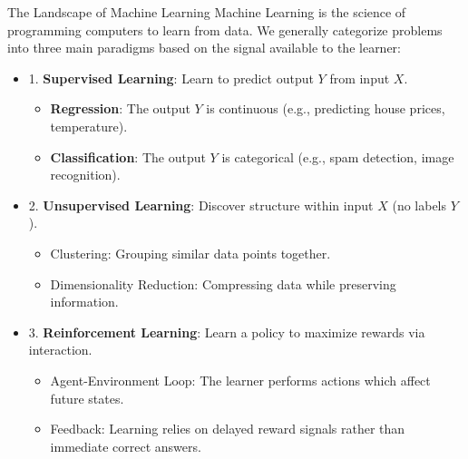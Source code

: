 \documentclass[aspectratio=169]{beamer}
\newcommand{\1}{\mathbf{1}}
\begin{document}
\begin{frame}{The Landscape of Machine Learning}
\small
    Machine Learning is the science of programming computers to learn from data.
    We generally categorize problems into three main paradigms based on the signal available to the learner:

    \vspace{0.5em}

    \begin{itemize}
        \setlength\itemsep{0.8em} %
        
        \item 1. \textbf{Supervised Learning}: Learn to predict output $Y$ from input $X$.
        \begin{itemize}
            \item \textbf{Regression}: The output $Y$ is continuous (e.g., predicting house prices, temperature).
            \item \textbf{Classification}: The output $Y$ is categorical (e.g., spam detection, image recognition).
        \end{itemize}

        \item 2. \textbf{Unsupervised Learning}: Discover structure within input $X$ (no labels $Y$).
        \begin{itemize}
            \item Clustering: Grouping similar data points together.
            \item Dimensionality Reduction: Compressing data while preserving information.
        \end{itemize}

        \item 3. \textbf{Reinforcement Learning}: Learn a policy to maximize rewards via interaction.
        \begin{itemize}
            \item Agent-Environment Loop: The learner performs actions which affect future states.
            \item Feedback: Learning relies on delayed reward signals rather than immediate correct answers.
        \end{itemize}
    \end{itemize}
\end{frame}
\end{document}
